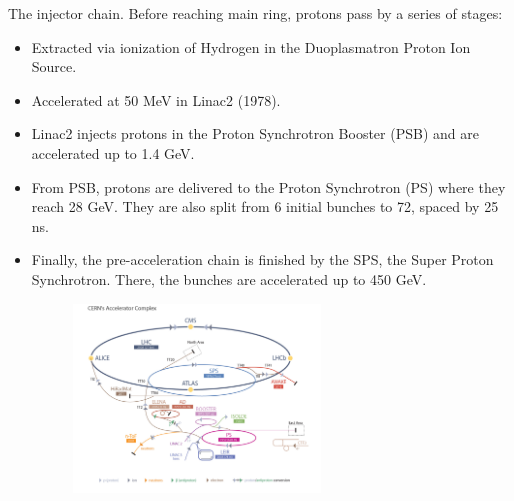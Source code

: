 \documentclass[8pt]{beamer}
\begin{document}

\begin{frame}[fragile]{The injector chain.}
Before reaching main ring, protons pass by a series of stages:
	\begin{itemize}
		\item Extracted via ionization of Hydrogen in the Duoplasmatron Proton Ion Source.
		\item Accelerated at 50 MeV in Linac2 (1978).
		\item  Linac2 injects protons in the Proton Synchrotron Booster (PSB)
		and are accelerated up to 1.4 GeV.
		\item From PSB, protons are delivered to the Proton Synchrotron (PS) where
		they reach 28 GeV. They are also split from 6 initial bunches to 72, spaced by 25 ns.
		\item  Finally, the pre-acceleration chain is finished by the SPS, the Super Proton Synchrotron. There, the bunches are accelerated up to 450 GeV.
	\end{itemize}
	\includegraphics[height=5cm,width=10cm]{2}
\end{frame}

\end{document}
